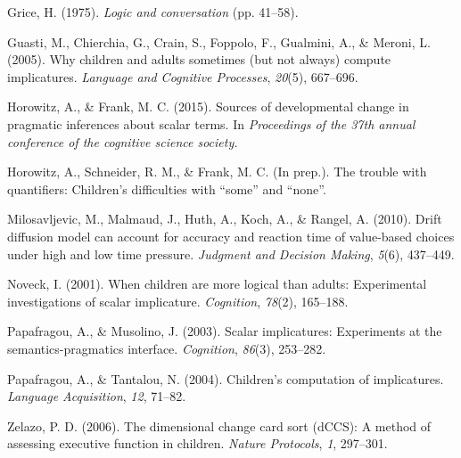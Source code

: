 \documentclass[10pt, letterpaper]{article}
\begin{document}
Grice, H. (1975). \emph{Logic and conversation} (pp. 41--58).

Guasti, M., Chierchia, G., Crain, S., Foppolo, F., Gualmini, A., \&
Meroni, L. (2005). Why children and adults sometimes (but not always)
compute implicatures. \emph{Language and Cognitive Processes},
\emph{20}(5), 667--696.

Horowitz, A., \& Frank, M. C. (2015). Sources of developmental change in
pragmatic inferences about scalar terms. In \emph{Proceedings of the
37th annual conference of the cognitive science society.}

Horowitz, A., Schneider, R. M., \& Frank, M. C. (In prep.). The trouble
with quantifiers: Children's difficulties with ``some'' and ``none''.

Milosavljevic, M., Malmaud, J., Huth, A., Koch, A., \& Rangel, A.
(2010). Drift diffusion model can account for accuracy and reaction time
of value-based choices under high and low time pressure. \emph{Judgment
and Decision Making}, \emph{5}(6), 437--449.

Noveck, I. (2001). When children are more logical than adults:
Experimental investigations of scalar implicature. \emph{Cognition},
\emph{78}(2), 165--188.

Papafragou, A., \& Musolino, J. (2003). Scalar implicatures: Experiments
at the semantics-pragmatics interface. \emph{Cognition}, \emph{86}(3),
253--282.

Papafragou, A., \& Tantalou, N. (2004). Children's computation of
implicatures. \emph{Language Acquisition}, \emph{12}, 71--82.

Zelazo, P. D. (2006). The dimensional change card sort (dCCS): A method
of assessing executive function in children. \emph{Nature Protocols},
\emph{1}, 297--301.
\end{document}
